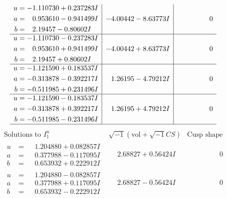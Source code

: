\documentclass[1p]{elsarticle_modified}
\theoremstyle{definition}
\newcommand{\I}{\sqrt{-1}}
\begin{document}
$$\begin{array}{c|c|c}
\begin{aligned}
u &= -1.110730 + 0.237283 I \\
a &= \phantom{-}0.953610 - 0.941499 I \\
b &= \phantom{-}2.19457 - 0.80602 I\end{aligned}
 & -4.00442 - 8.63773 I & \phantom{-0.000000 } 0 \\ \hline\begin{aligned}
u &= -1.110730 - 0.237283 I \\
a &= \phantom{-}0.953610 + 0.941499 I \\
b &= \phantom{-}2.19457 + 0.80602 I\end{aligned}
 & -4.00442 + 8.63773 I & \phantom{-0.000000 } 0 \\ \hline\begin{aligned}
u &= -1.121590 + 0.183537 I \\
a &= -0.313878 - 0.392217 I \\
b &= -0.511985 + 0.231496 I\end{aligned}
 & \phantom{-}1.26195 - 4.79212 I & \phantom{-0.000000 } 0 \\ \hline\begin{aligned}
u &= -1.121590 - 0.183537 I \\
a &= -0.313878 + 0.392217 I \\
b &= -0.511985 - 0.231496 I\end{aligned}
 & \phantom{-}1.26195 + 4.79212 I & \phantom{-0.000000 } 0\\
 \hline 
 \end{array}$$\newpage$$\begin{array}{c|c|c}  
\text{Solutions to }I^u_{1}& \I (\text{vol} + \sqrt{-1}CS) & \text{Cusp shape}\\
 \hline 
\begin{aligned}
u &= \phantom{-}1.204880 + 0.082857 I \\
a &= \phantom{-}0.377988 - 0.117095 I \\
b &= \phantom{-}0.653932 + 0.222912 I\end{aligned}
 & \phantom{-}2.68827 + 0.56424 I & \phantom{-0.000000 } 0 \\ \hline\begin{aligned}
u &= \phantom{-}1.204880 - 0.082857 I \\
a &= \phantom{-}0.377988 + 0.117095 I \\
b &= \phantom{-}0.653932 - 0.222912 I\end{aligned}
 & \phantom{-}2.68827 - 0.56424 I & \phantom{-0.000000 } 0 \\ \hline\begin{aligned}

\end{aligned}
\end{array}$$
\end{document}
